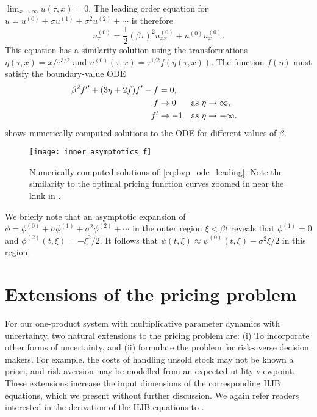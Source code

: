 \documentclass[main.tex]{subfiles}
\begin{document}
$\lim_{x\to \infty}u(\tau,x) = 0$.
The leading order equation for $u = u^{(0)}+\sigma u^{(1)}+\sigma^2 u^{(2)}+\cdots$ is therefore
\begin{equation}
  u^{(0)}_\tau = \frac{1}{2}{(\beta \tau)}^2u^{(0)}_{xx} + u^{(0)}u^{(0)}_x.
\end{equation}
This equation has a similarity solution using the transformations
$\eta(\tau,x)= x/\tau^{3/2}$ and $u^{(0)}(\tau,x) = \tau^{1/2}f(\eta(\tau,x))$.
The function $f(\eta)$ must satisfy the boundary-value ODE
\begin{align}\label{eq:bvp_ode_leading}
  \beta^2f^{\prime\prime} + (3\eta + 2f)f^\prime - f
  &= 0,\\
  f&\to 0 &\textnormal{as } \eta&\to \infty,\\
  f^\prime &\to -1&\textnormal{as } \eta&\to -\infty.
\end{align}
 shows numerically computed solutions to the
ODE for different values of $\beta$.
\begin{figure}[hbt]
  \centering
  \texttt{[image: inner\_asymptotics\_f]}
  \caption{Numerically computed solutions of~\eqref{eq:bvp_ode_leading}.
    Note the similarity to the optimal pricing function curves zoomed
    in near the kink in .
  }\label{fig:inner_leading_f}
\end{figure}

We briefly note that an asymptotic expansion of
$\phi=\phi^{(0)}+\sigma\phi^{(1)}+\sigma^2\phi^{(2)}+\cdots$
in the outer region $\xi<\beta t$ reveals that $\phi^{(1)}=0$ and
$\phi^{(2)}(t,\xi)=-\xi^2/2$. It follows that
$\psi(t,\xi)\approx \psi^{(0)}(t,\xi)-\sigma^2 \xi/2$ in this region.

\section{Extensions of the pricing problem}\label{sec:extensions}
For our one-product system with multiplicative parameter dynamics with uncertainty,
two natural extensions to the pricing problem are: (i) To incorporate
other forms of uncertainty, and (ii) formulate the problem for risk-averse
decision makers. For example, the costs of handling unsold stock may
not be known a priori, and risk-aversion may be modelled from an
expected utility viewpoint.
These extensions increase the input dimensions of the corresponding
HJB equations, which we present without further discussion. We again
refer readers interested in the
derivation of the HJB equations to \citet{pham2009continuous}.
\end{document}

